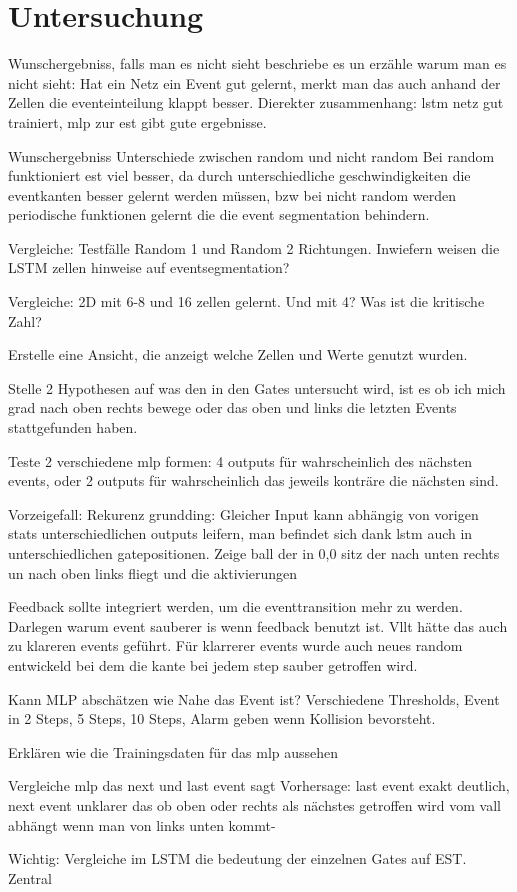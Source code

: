\chapter{Untersuchung}
\label{ch:untersuchung}
Wunschergebniss, falls man es nicht sieht beschriebe es un erzähle warum man es nicht sieht: 
Hat ein Netz ein Event gut gelernt, merkt man das auch anhand der Zellen die eventeinteilung klappt besser.
Dierekter zusammenhang: lstm netz gut trainiert, mlp zur est gibt gute ergebnisse.

Wunschergebniss
Unterschiede zwischen random und nicht random
Bei random funktioniert est viel besser,  da  durch unterschiedliche geschwindigkeiten die eventkanten besser gelernt werden müssen, bzw bei nicht random werden periodische funktionen gelernt die die event segmentation behindern.

Vergleiche: Testfälle Random 1 und Random 2 Richtungen. Inwiefern weisen die LSTM zellen hinweise auf eventsegmentation? 

Vergleiche: 2D mit 6-8 und 16 zellen gelernt.
Und mit 4? Was ist die kritische Zahl?

Erstelle eine Ansicht, die anzeigt welche Zellen und Werte genutzt wurden.

Stelle 2 Hypothesen auf was den in den Gates untersucht wird, ist es ob ich mich grad nach oben rechts bewege oder das oben und links die letzten Events stattgefunden haben.

Teste 2 verschiedene mlp formen: 4 outputs für wahrscheinlich des nächsten events,
oder 2 outputs für wahrscheinlich das jeweils konträre die nächsten sind.


Vorzeigefall: Rekurenz grundding: Gleicher Input kann abhängig von vorigen stats unterschiedlichen outputs leifern, man befindet sich dank lstm auch in unterschiedlichen gatepositionen.
Zeige ball der in 0,0 sitz der nach unten rechts un nach oben links fliegt und die aktivierungen

Feedback sollte integriert werden, um die eventtransition mehr zu werden. Darlegen warum event sauberer is wenn feedback benutzt ist. Vllt hätte das auch zu klareren events geführt. Für klarrerer events wurde auch neues random entwickeld bei dem die kante bei jedem step sauber getroffen wird.

Kann MLP abschätzen wie Nahe das Event ist?
Verschiedene Thresholds, Event in 2 Steps, 5 Steps, 10 Steps, Alarm geben wenn Kollision bevorsteht.

Erklären wie die Trainingsdaten für das mlp aussehen

Vergleiche mlp das next und last event sagt
Vorhersage: last event exakt deutlich, next event unklarer das ob oben oder rechts als nächstes getroffen wird vom vall abhängt wenn man von links unten kommt-

Wichtig:
Vergleiche im LSTM die bedeutung der einzelnen Gates auf EST. Zentral
